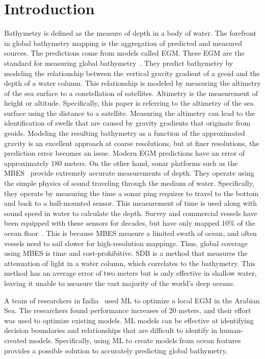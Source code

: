 \section{Introduction}
\setlength{\parindent}{10ex}
Bathymetry is defined as the measure of depth in a body of water.
The forefront in global bathymetry mapping is the aggregation of predicted and measured sources. 
The predictions come from models called \ac{EGM}.
These \acf{EGM} are the standard for measuring global bathymetry~\cite{becker2009global,smith1994bathymetric,smith1997global,smith2010planning}.
They predict bathymetry by modeling the relationship between the vertical gravity gradient of a geoid and the depth of a water column.
This relationship is modeled by measuring the altimetry of the sea surface to a constellation of satellites.
Altimetry is the measurement of height or altitude. 
Specifically, this paper is referring to the altimetry of the sea surface using the distance to a satellite.
Measuring the altimetry can lead to the identification of swells that are caused by gravity gradients that originate from geoids.
Modeling the resulting bathymetry as a function of the approximated gravity is an excellent approach at coarse resolutions, but at finer resolutions, the prediction error becomes an issue.
Modern \ac{EGM} predictions have an error of approximately 180 meters.
On the other hand, sonar platforms such as the \ac{MBES}~\cite{farr1980multibeam} provide extremely accurate measurements of depth.
They operate using the simple physics of sound traveling through the medium of water.
Specifically, they operate by measuring the time a sonar ping requires to travel to the bottom and back to a hull-mounted sensor.
This measurement of time is used along with sound speed in water to calculate the depth.
Survey and commercial vessels have been equipped with these sensors for decades, but have only mapped 10\% of the ocean floor~\cite{becker2009global}.
This is because \ac{MBES} measure a limited swath of ocean, and often vessels need to sail slower for high-resolution mappings.
Thus, global coverage using \ac{MBES} is time and cost-prohibitive.
\ac{SDB} is a method that measures the attenuation of light in a water column, which correlates to the bathymetry.
This method has an average error of two meters but is only effective in shallow water, leaving it unable to measure the vast majority of the world's deep oceans.

\par
A team of researchers in India~\cite{jena2012prediction} used \ac{ML} to optimize a local \ac{EGM} in the Arabian Sea.
The researchers found performance increases of 20 meters, and their effort was used to optimize existing models.
\ac{ML} models can be effective at identifying decision boundaries and relationships that are difficult to identify in human-created models.
Specifically, using \ac{ML} to create models from ocean features provides a possible solution to accurately predicting global bathymetry.

